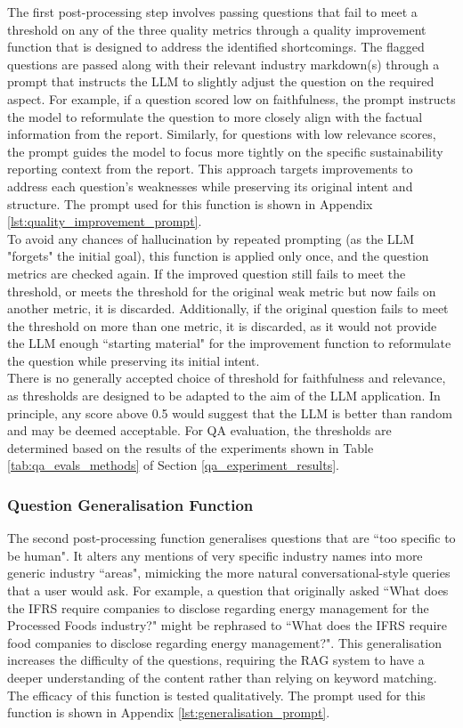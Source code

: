 The first post-processing step involves passing questions that fail to meet a threshold on any of the three quality metrics through a quality improvement function that is designed to address the identified shortcomings. The flagged questions are passed along with their relevant industry markdown(s) through a prompt that instructs the LLM to slightly adjust the question on the required aspect. For example, if a question scored low on faithfulness, the prompt instructs the model to reformulate the question to more closely align with the factual information from the report. Similarly, for questions with low relevance scores, the prompt guides the model to focus more tightly on the specific sustainability reporting context from the report. This approach targets improvements to address each question's weaknesses while preserving its original intent and structure. The prompt used for this function is shown in Appendix \ref{lst:quality_improvement_prompt}.\\


To avoid any chances of hallucination by repeated prompting (as the LLM "forgets" the initial goal), this function is applied only once, and the question metrics are checked again. If the improved question still fails to meet the threshold, or meets the threshold for the original weak metric but now fails on another metric, it is discarded. Additionally, if the original question fails to meet the threshold on more than one metric, it is discarded, as it would not provide the LLM enough ``starting material" for the improvement function to reformulate the question while preserving its initial intent. \\

There is no generally accepted choice of threshold for faithfulness and relevance, as thresholds are designed to be adapted to the aim of the LLM application. In principle, any score above 0.5 would suggest that the LLM is better than random and may be deemed acceptable. For QA evaluation, the thresholds are determined based on the results of the experiments shown in Table \ref{tab:qa_evals_methods} of Section \ref{qa_experiment_results}. 


\subsubsection{Question Generalisation Function}

The second post-processing function generalises questions that are ``too specific to be human". It alters any mentions of very specific industry names into more generic industry ``areas", mimicking the more natural conversational-style queries that a user would ask. For example, a question that originally asked ``What does the IFRS require companies to disclose regarding energy management for the Processed Foods industry?" might be rephrased to ``What does the IFRS require food companies to disclose regarding energy management?". This generalisation increases the difficulty of the questions, requiring the RAG system to have a deeper understanding of the content rather than relying on keyword matching. The efficacy of this function is tested qualitatively. The prompt used for this function is shown in Appendix \ref{lst:generalisation_prompt}.


